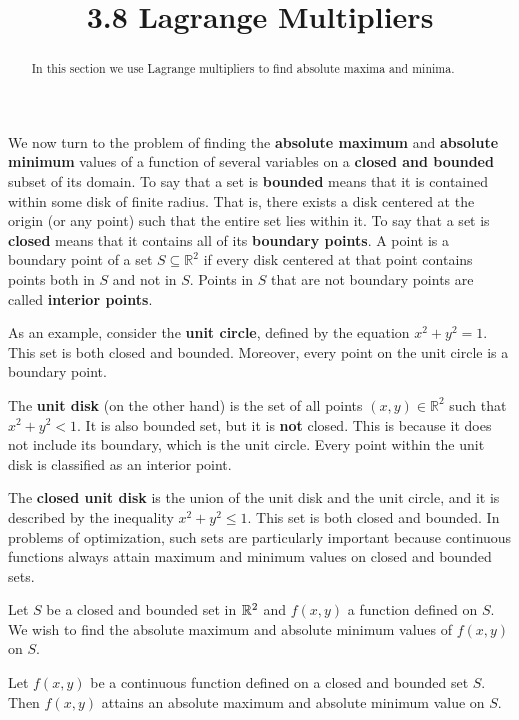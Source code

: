 \documentclass[handout]{ximera}
\title{3.8 Lagrange Multipliers}
\begin{document}
\begin{abstract}
In this section we use Lagrange multipliers to find absolute maxima and minima.
\end{abstract}

\maketitle


We now turn to the problem of finding the \textbf{absolute maximum} and \textbf{absolute minimum} values of a function of 
several variables on a \textbf{closed and bounded} subset of its domain. To say that a set is \textbf{bounded} means that it is 
contained within some disk of finite radius. That is, there exists a disk centered at the origin (or any point) such that the entire set lies within it.
To say that a set is \textbf{closed} means that it contains all of its \textbf{boundary points}. A point is a 
boundary point of a set $S \subseteq \mathbb{R}^2$ if every disk centered at that point contains points both in $S$ and not in $S$. 
Points in $S$ that are not boundary points are called \textbf{interior points}.

As an example, consider the \textbf{unit circle}, defined by the equation $x^2 + y^2 = 1$. This set is both closed and bounded. Moreover, every 
point on the unit circle is a boundary point.

The \textbf{unit disk} (on the other hand) is the set of all points $(x, y) \in \mathbb{R}^2$ such that $x^2 + y^2 < 1$. It is also bounded set, 
but it is \textbf{not} closed. This is because it does not include its boundary, which is the unit circle. 
Every point within the unit disk is classified as an interior point.

The \textbf{closed unit disk} is the union of the unit disk and the unit circle, and it is described by the inequality $x^2 + y^2 \leq 1$. 
This set is both closed and bounded. In problems of optimization, such sets are particularly important because continuous functions always 
attain maximum and minimum values on closed and bounded sets. 

Let $S$ be a closed and bounded set in $\mathbb R^2$ and $f(x,y)$ a function defined on $S$. 
We wish to find the absolute maximum and absolute minimum values of $f(x,y)$ on $S$.

\begin{theorem}
Let $f(x,y)$ be a continuous function defined on a closed and bounded set $S$.
Then $f(x,y)$ attains an absolute maximum and absolute minimum value on $S$.
\end{theorem}
\end{document}
